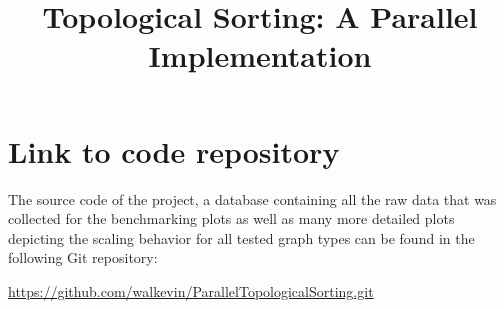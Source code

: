 \documentclass[letterpaper]{article}
\title{Topological Sorting: A Parallel Implementation}
\begin{document}
\maketitle








\section{Link to code repository}
%
The source code of the project, a database containing all the raw data that was collected for the benchmarking plots as well as many more detailed plots depicting the scaling behavior for all tested graph types can be found in the following Git repository:
\begin{center}
	\href{https://github.com/walkevin/ParallelTopologicalSorting.git}{https://github.com/walkevin/ParallelTopologicalSorting.git}
\end{center}




\end{document}
